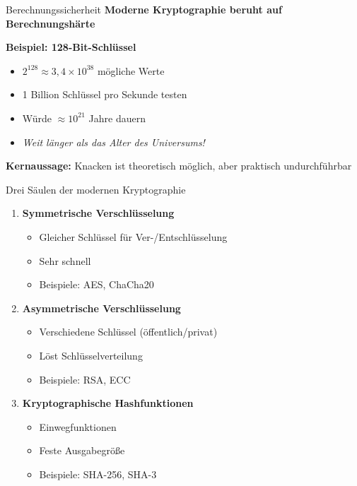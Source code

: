 \documentclass[handout]{beamer}
\begin{document}
\begin{frame}{Berechnungssicherheit}
\textbf{Moderne Kryptographie beruht auf Berechnungshärte}

\vspace{0.3cm}
\textbf{Beispiel: 128-Bit-Schlüssel}
\begin{itemize}
    \item $2^{128} \approx 3,4 \times 10^{38}$ mögliche Werte
    \item 1 Billion Schlüssel pro Sekunde testen
    \item Würde $\approx 10^{21}$ Jahre dauern
    \item \emph{Weit länger als das Alter des Universums!}
\end{itemize}

\vspace{0.3cm}
\textbf{Kernaussage:}
Knacken ist theoretisch möglich, aber praktisch undurchführbar
\end{frame}

\begin{frame}{Drei Säulen der modernen Kryptographie}
\begin{enumerate}
    \item<1-> \textbf{Symmetrische Verschlüsselung}
    \begin{itemize}
        \item Gleicher Schlüssel für Ver-/Entschlüsselung
        \item Sehr schnell
        \item Beispiele: AES, ChaCha20
    \end{itemize}

    \item<2-> \textbf{Asymmetrische Verschlüsselung}
    \begin{itemize}
        \item Verschiedene Schlüssel (öffentlich/privat)
        \item Löst Schlüsselverteilung
        \item Beispiele: RSA, ECC
    \end{itemize}

    \item<3-> \textbf{Kryptographische Hashfunktionen}
    \begin{itemize}
        \item Einwegfunktionen
        \item Feste Ausgabegröße
        \item Beispiele: SHA-256, SHA-3
    \end{itemize}
\end{enumerate}

\end{frame}
\end{document}
